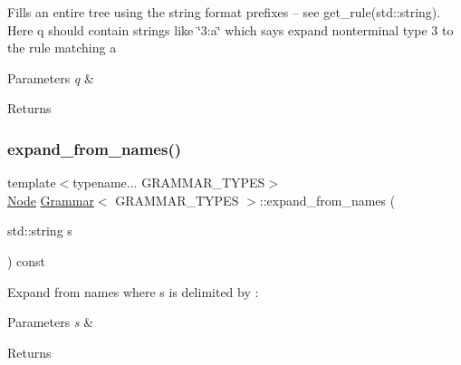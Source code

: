 Fills an entire tree using the string format prefixes -- see get\+\_\+rule(std\+::string). Here q should contain strings like \char`\"{}3\+:\textquotesingle{}a\textquotesingle{}\char`\"{} which says expand nonterminal type 3 to the rule matching \textquotesingle{}a\textquotesingle{} 
\begin{DoxyParams}{Parameters}
{\em q} & \\
\hline
\end{DoxyParams}
\begin{DoxyReturn}{Returns}

\end{DoxyReturn}
\mbox{\label{class_grammar_a53a651b1fb2cad39efc4717b635b922e}} 
\subsubsection{\texorpdfstring{expand\+\_\+from\+\_\+names()}{expand\_from\_names()}\hspace{0.1cm}{\footnotesize\ttfamily [2/3]}}
{\footnotesize\ttfamily template$<$typename... G\+R\+A\+M\+M\+A\+R\+\_\+\+T\+Y\+P\+ES$>$ \\
\hyperlink{class_node}{Node} \hyperlink{class_grammar}{Grammar}$<$ G\+R\+A\+M\+M\+A\+R\+\_\+\+T\+Y\+P\+ES $>$\+::expand\+\_\+from\+\_\+names (\begin{DoxyParamCaption}\item[{std\+::string}]{s }\end{DoxyParamCaption}) const\hspace{0.3cm}{\ttfamily [inline]}}

Expand from names where s is delimited by \textquotesingle{}\+:\textquotesingle{} 
\begin{DoxyParams}{Parameters}
{\em s} & \\
\hline
\end{DoxyParams}
\begin{DoxyReturn}{Returns}

\end{DoxyReturn}
\mbox{\label{class_grammar_af4f8e4c2b0ad93970e579ea56c2fde60}} 
